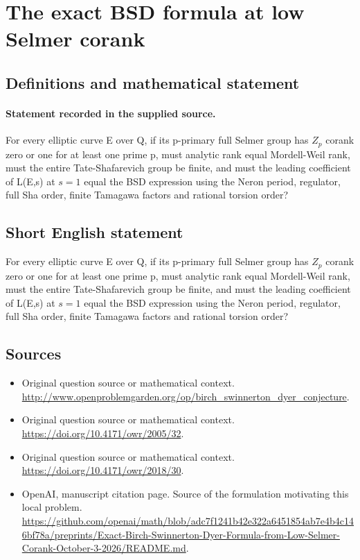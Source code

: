 \documentclass[11pt]{article}
\begin{document}
\section*{The exact BSD formula at low Selmer corank}\label{statement}
\subsection{Definitions and mathematical statement}
\paragraph{Statement recorded in the supplied source.}
For every elliptic curve E over Q, if its p-primary full Selmer group has $Z_p$ corank zero or one for at least one prime p, must analytic rank equal Mordell-Weil rank, must the entire Tate-Shafarevich group be finite, and must the leading coefficient of L(E,s) at $s=1$ equal the BSD expression using the Neron period, regulator, full Sha order, finite Tamagawa factors and rational torsion order?
\subsection{Short English statement}
For every elliptic curve E over Q, if its p-primary full Selmer group has $Z_p$ corank zero or one for at least one prime p, must analytic rank equal Mordell-Weil rank, must the entire Tate-Shafarevich group be finite, and must the leading coefficient of L(E,s) at $s=1$ equal the BSD expression using the Neron period, regulator, full Sha order, finite Tamagawa factors and rational torsion order?
\subsection{Sources}
\begin{itemize}
\item[S1] Original question source or mathematical context.
\url{http://www.openproblemgarden.org/op/birch_swinnerton_dyer_conjecture}.
\item[S2] Original question source or mathematical context.
\url{https://doi.org/10.4171/owr/2005/32}.
\item[S3] Original question source or mathematical context.
\url{https://doi.org/10.4171/owr/2018/30}.
\item[S4] OpenAI, manuscript citation page. Source of the formulation motivating this local problem.
\url{https://github.com/openai/math/blob/adc7f1241b42e322a6451854ab7e4b4c146bf78a/preprints/Exact-Birch-Swinnerton-Dyer-Formula-from-Low-Selmer-Corank-October-3-2026/README.md}.
\end{itemize}
\end{document}
